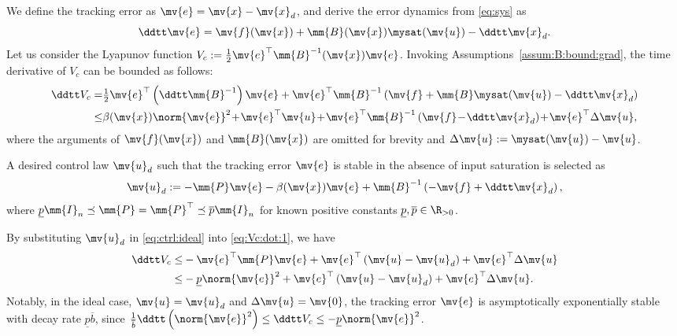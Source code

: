 \documentclass[letterpaper, journal, twoside]{IEEEtran}
\begin{document}
We define the tracking error as $\mv{e} = \mv{x} - \mv{x}_d$, and derive the error dynamics from \eqref{eq:sys} as
\begin{equation} \label{eq:error:dyn}
    \ddtt\mv{e}
    =
    \mv{f}(\mv{x}) + \mm{B}(\mv{x})\mysat(\mv{u}) - \ddtt\mv{x}_d
    .
\end{equation}
Let us consider the Lyapunov function $V_c:=\tfrac{1}{2}\mv{e}^\top\mm{B}^{-1}(\mv{x})\mv{e}$.
Invoking Assumptions~\ref{assum:B:bound:grad}, the time derivative of $V_c$ can be bounded as follows:
\begin{align} \label{eq:Vc:dot:1} \nonumber
  \ddtt V_c
  =&
  \tfrac{1}{2}\mv{e}^\top
  \left(
    \ddtt\mm{B}^{-1}
  \right)
  \mv{e}
  +
  \mv{e}^\top\mm{B}^{-1}
  \left(
    \mv{f} + \mm{B}\mysat(\mv{u}) 
    - \ddtt\mv{x}_d
  \right)
  \\
  \le&
  \beta(\mv{x})\norm{\mv{e}}^2
  \!+\!
  \mv{e}^\top\mv{u}
  \!+\!
  \mv{e}^\top\mm{B}^{-1}
  \left(
    \mv{f} \!-\! \ddtt\mv{x}_d
  \right)
  \!+\!
  \mv{e}^\top
  \Delta\mv{u}
  ,
\end{align}
where the arguments of $\mv{f}(\mv{x})$ and $\mm{B}(\mv{x})$ are omitted for brevity and $\Delta\mv{u} := \mysat(\mv{u}) - \mv{u}$.

A desired control law $\mv{u}_d$ such that the tracking error $\mv{e}$ is stable in the absence of input saturation is selected as 
\begin{equation} \label{eq:ctrl:ideal}
  \mv{u}_d
  :=
  -
  \mm{P}
  \mv{e}
  - 
  \beta(\mv{x})\mv{e}
  +
  \mm{B}^{-1}
  \left(
    - \mv{f} 
    + \ddtt\mv{x}_d
  \right)
  ,
\end{equation}
where $\underline{p}\mm{I}_n \preceq \mm{P}=\mm{P}^\top \preceq \overline{p}\mm{I}_n$ for known positive constants $\underline{p},\overline{p}\in\R_{>0}$.

By substituting $\mv{u}_d$ in \eqref{eq:ctrl:ideal} into \eqref{eq:Vc:dot:1}, we have
\begin{align} \label{eq:Vc:dot:2} 
  \ddtt V_c
  \le &
  -\mv{e}^\top
  \mm{P}
  \mv{e}
  +
  \mv{e}^\top
  \left(
    \mv{u} - \mv{u}_d
  \right)
  +
  \mv{e}^\top
  \Delta\mv{u}
  \\ \nonumber
  \le & 
  -
  \underline{p}\norm{\mv{e}}^2
  +
  \mv{e}^\top
  \left(
    \mv{u} - \mv{u}_d       
  \right)
  +
  \mv{e}^\top
    \Delta\mv{u}
  .
\end{align}
Notably, in the ideal case, \ie $\mv{u} = \mv{u}_d$ and $\Delta\mv{u} = \mv{0}$, the tracking error $\mv{e}$ is asymptotically exponentially stable with decay rate $\underline{p}\overline{b}$, since 
$
  \tfrac{1}{\overline{b}}
  \ddtt
  \left(
    \norm{\mv{e}}^2
  \right)
  \le
  \ddtt V_c 
  \le 
  -\underline{p}\norm{\mv{e}}^2
$.
\end{document}
